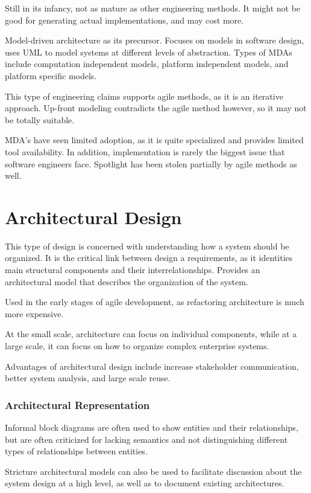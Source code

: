\documentclass[12pt]{article}
\begin{document}
Still in its infancy, not as mature as other engineering methods. It might not be good for generating actual implementations, and may cost more.

Model-driven architecture as its precursor. Focuses on models in software design, uses UML to model systems at different levels of abstraction. Types of MDAs include computation independent models, platform independent models, and platform specific models.

This type of engineering claims supports agile methods, as it is an iterative approach. Up-front modeling contradicts the agile method however, so it may not be totally suitable.

MDA's have seen limited adoption, as it is quite specialized and provides limited tool availability. In addition, implementation is rarely the biggest issue that software engineers face. Spotlight has been stolen partially by agile methods as well.

\pagebreak
\section*{Architectural Design}

This type of design is concerned with understanding how a system should be organized. It is the critical link between design a requirements, as it identities main structural components and their interrelationships. Provides an architectural model that describes the organization of the system.

Used in the early stages of agile development, as refactoring architecture is much more expensive.

At the small scale, architecture can focus on individual components, while at a large scale, it can focus on how to organize complex enterprise systems.

Advantages of architectural design include increase stakeholder communication, better system analysis, and large scale reuse.

\subsubsection*{Architectural Representation}

Informal block diagrams are often used to show entities and their relationships, but are often criticized for lacking semantics and not distinguishing different types of relationships between entities.

Stricture architectural models can also be used to facilitate discussion about the system design at a high level, as well as to document existing architectures.
\end{document}
